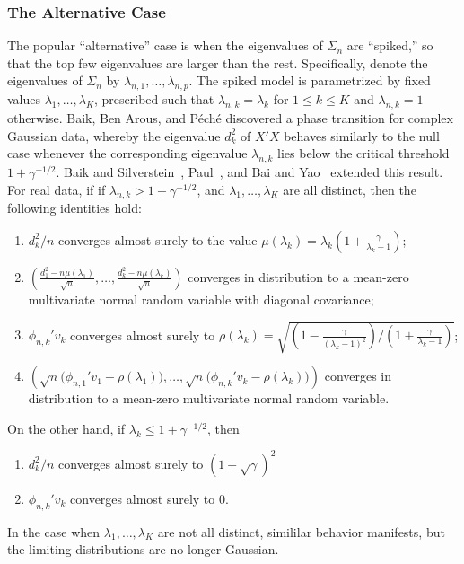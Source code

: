 \documentclass{eoeauth}
\begin{document}
\subsubsection{The Alternative Case}
 The popular ``alternative'' case is when the eigenvalues of $\Sigma_n$ are
``spiked,'' so that the top few eigenvalues are larger than the rest.
Specifically, denote the eigenvalues of $\Sigma_n$ by $\lambda_{n,1},
\dotsc, \lambda_{n,p}$.  The spiked model is parametrized by fixed
values $\lambda_1, \dotsc, \lambda_K$, prescribed such
that $\lambda_{n,k} = \lambda_k$ for $1 \leq k \leq K$ and
$\lambda_{n,k} = 1$ otherwise.  Baik, Ben Arous, and P\'ech\'e
\cite{baik2005ptl} discovered a phase
transition for complex Gaussian data, whereby the eigenvalue $d_k^2$
of $X' X$ behaves similarly to the null case
whenever the corresponding eigenvalue $\lambda_{n,k}$
lies below the critical threshold $1 + \gamma^{-1/2}$.  Baik and
Silverstein~\cite{baik2006els}, Paul~\cite{paul2007ase}, and Bai and
Yao~\cite{bai08central} extended this result.  For real data, if
if $\lambda_{n,k} > 1 + \gamma^{-1/2}$, and $\lambda_{1}, \dotsc,
\lambda_K$ are all distinct, then the following identities hold:
\begin{enumerate}
  \item $d_{k}^2 / n$ converges almost surely to
    the value $\mu(\lambda_k) = \lambda_k (1 + \frac{\gamma}{\lambda_k
      - 1})$;
  \item $\left(\frac{d_{1}^2 - n \mu(\lambda_1)}{\sqrt{n}}, \dotsc,
    \frac{d_{k}^2 - n \mu(\lambda_k)}{\sqrt{n}}\right)$ converges in
    distribution to a mean-zero multivariate normal random variable with
    diagonal covariance;
  \item $\phi_{n,k}' v_k$ converges almost surely to
    $\rho(\lambda_k) = \sqrt{\left(1 - \frac{\gamma}{(\lambda_k -
          1)^2}\right) / \left(1 + \frac{\gamma}{\lambda_k - 1}\right)}$;
  \item 
     $\left(\sqrt{n}\big(\phi_{n,1}' v_1 - \rho(\lambda_1)\big), \dotsc,
       \sqrt{n}\big(\phi_{n,k}' v_k - \rho(\lambda_k)\big)\right)$
     converges in distribution to a mean-zero multivariate normal
     random variable.
\end{enumerate}
On the other hand, if $\lambda_k \leq 1 + \gamma^{-1/2}$, then
\begin{enumerate}
  \item $d_k^2 / n$ converges almost surely to $(1 + \sqrt{\gamma})^2$
  \item $\phi_{n,k}' v_k$ converges almost surely to $0$.
\end{enumerate}
In the case when $\lambda_1, \dotsc, \lambda_K$ are not all distinct,
simililar behavior manifests, but the limiting distributions are no
longer Gaussian.
\end{document}
